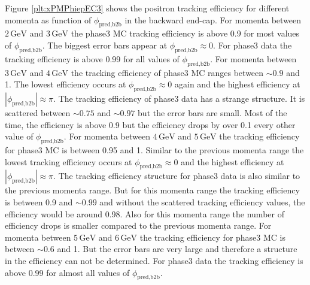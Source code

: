 \documentclass[a4paper,11pt,twosided,final,german,openbib,pdftex,listof=totoc,bibliography=totoc]{scrbook}
\begin{document}
Figure \ref{plt:xPMPhiepEC3} shows the positron tracking efficiency for different momenta as function of $\phi_{\textrm{pred,b2b}}$ in the backward end-cap.
For momenta between $2\,\textrm{GeV}$ and $3\,\textrm{GeV}$ the phase3 MC tracking efficiency is above 0.9 for most values of $\phi_{\textrm{pred,b2b}}$. The biggest error bars appear at $\phi_{\textrm{pred,b2b}} \approx 0$. For phase3 data the tracking efficiency is above 0.99 for all values of $\phi_{\textrm{pred,b2b}}$.
For momenta between $3\,\textrm{GeV}$ and $4\,\textrm{GeV}$ the tracking efficiency of phase3 MC ranges between $\sim 0.9$ and 1. The lowest efficiency occurs at $\phi_{\textrm{pred,b2b}} \approx 0$ again and the highest efficiency at $|\phi_{\textrm{pred,b2b}}| \approx \pi$. The tracking efficiency of phase3 data has a strange structure. It is scattered between $\sim 0.75$ and $\sim 0.97$ but the error bars are small. Most of the time, the efficiency is above 0.9 but the efficiency drops by over 0.1 every other value of $\phi_{\textrm{pred,b2b}}$.
For momenta between $4\,\textrm{GeV}$ and $5\,\textrm{GeV}$ the tracking efficiency for phase3 MC is between 0.95 and 1. Similar to the previous momenta range the lowest tracking efficiency occurs at  $\phi_{\textrm{pred,b2b}} \approx 0$ and the highest efficiency at $|\phi_{\textrm{pred,b2b}}| \approx \pi$. The tracking efficiency structure for phase3 data is also similar to the previous momenta range. But for this momenta range the tracking efficiency is between 0.9 and $\sim 0.99$ and without the scattered tracking efficiency values, the efficiency would be around 0.98. Also for this momenta range the number of efficiency drops is smaller compared to the previous momenta range.
For momenta between $5\,\textrm{GeV}$ and $6\,\textrm{GeV}$ the tracking efficiency for phase3 MC is between $\sim 0.6$ and 1. But the error bars are very large and therefore a structure in the efficiency can not be determined. For phase3 data the tracking efficiency is above 0.99 for almost all values of $\phi_{\textrm{pred,b2b}}$.
\end{document}
